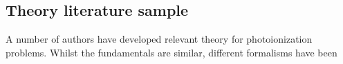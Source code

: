 \subsection{Theory literature sample\label{sec:theory-lit}}

A number of authors have developed relevant theory for photoionization problems. Whilst the fundamentals are similar, different formalisms have been 